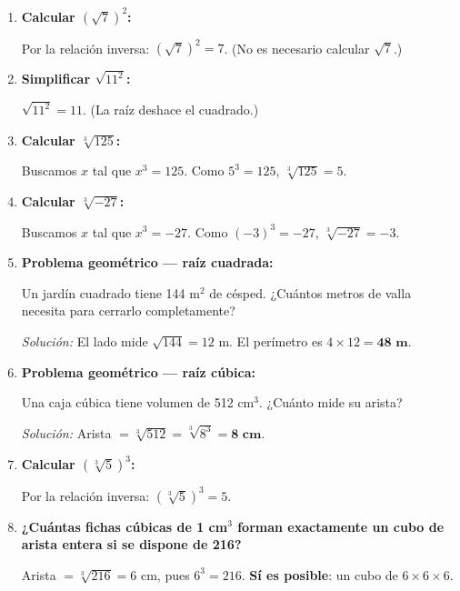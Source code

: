 \documentclass[11pt, letterpaper]{article}
\begin{document}
\begin{tcolorbox}[examplebox, title={Ejemplos}]
\begin{enumerate}[label=\textbf{Ej. \arabic*.}, leftmargin=*]

\item \textbf{Calcular $(\sqrt{7})^2$:}

Por la relación inversa: $(\sqrt{7})^2 = 7$. \hfill (No es necesario calcular $\sqrt{7}$.)

\item \textbf{Simplificar $\sqrt{11^2}$:}

$\sqrt{11^2} = 11$. \hfill (La raíz deshace el cuadrado.)

\item \textbf{Calcular $\sqrt[3]{125}$:}

Buscamos $x$ tal que $x^3=125$. Como $5^3=125$, $\sqrt[3]{125}=5$.

\item \textbf{Calcular $\sqrt[3]{-27}$:}

Buscamos $x$ tal que $x^3=-27$. Como $(-3)^3=-27$, $\sqrt[3]{-27}=-3$.

\item \textbf{Problema geométrico — raíz cuadrada:}

Un jardín cuadrado tiene 144 m$^2$ de césped. ¿Cuántos metros de valla necesita para cerrarlo completamente?

\textit{Solución:} El lado mide $\sqrt{144}=12$ m. El perímetro es $4 \times 12 = \textbf{48 m}$.

\item \textbf{Problema geométrico — raíz cúbica:}

Una caja cúbica tiene volumen de 512 cm$^3$. ¿Cuánto mide su arista?

\textit{Solución:} Arista $= \sqrt[3]{512} = \sqrt[3]{8^3} = \textbf{8 cm}$.

\item \textbf{Calcular $(\sqrt[3]{5})^3$:}

Por la relación inversa: $(\sqrt[3]{5})^3=5$.

\item \textbf{¿Cuántas fichas cúbicas de 1 cm$^3$ forman exactamente un cubo de arista entera si se dispone de 216?}

Arista $= \sqrt[3]{216} = 6$ cm, pues $6^3=216$. \textbf{Sí es posible}: un cubo de $6\times6\times6$.

\end{enumerate}
\end{tcolorbox}
\end{document}
